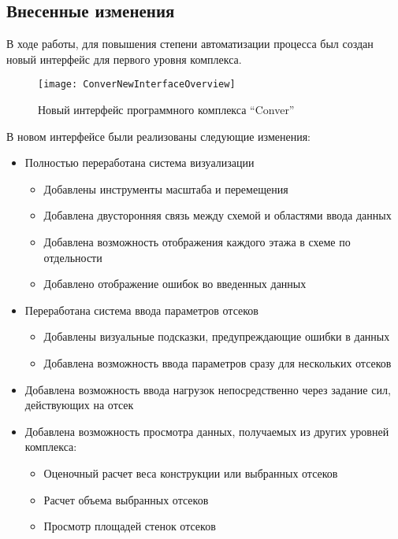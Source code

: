 \subsection{Внесенные изменения}

В ходе работы, для повышения степени автоматизации процесса был создан новый интерфейс  для первого уровня комплекса. 

\begin{figure}[h]
\centering
\texttt{[image: ConverNewInterfaceOverview]}
\caption{Новый интерфейс программного комплекса ``Conver''}
\label{fig:ConverNewInterfaceOverview}
\end{figure}


В новом интерфейсе были реализованы следующие изменения:

\begin{itemize}
	\item Полностью переработана система визуализации
	\begin{itemize}
		\item Добавлены инструменты масштаба и перемещения
		\item Добавлена двусторонняя связь между схемой и областями ввода данных
		\item Добавлена возможность отображения каждого этажа в 		схеме по отдельности
		\item Добавлено отображение ошибок во введенных данных
	\end{itemize}
	\item Переработана система ввода параметров отсеков
	\begin{itemize}
		\item Добавлены визуальные подсказки, предупреждающие ошибки в данных
		\item Добавлена возможность ввода параметров сразу для нескольких отсеков
	\end{itemize}
	\item Добавлена возможность ввода нагрузок непосредственно через задание сил, действующих на отсек
	\item Добавлена возможность просмотра данных, получаемых из других уровней комплекса:
	\begin{itemize}
		\item Оценочный расчет веса конструкции или выбранных отсеков
		\item Расчет объема выбранных отсеков
		\item Просмотр площадей стенок отсеков
	\end{itemize}
\end{itemize}

